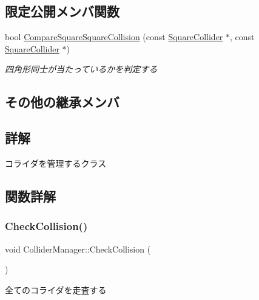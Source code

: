 \subsection*{限定公開メンバ関数}
\begin{DoxyCompactItemize}
\item 
bool \mbox{\hyperlink{class_collider_manager_a612f6096ca24702bff6dee04a88a40c3}{Compare\+Square\+Square\+Collision}} (const \mbox{\hyperlink{class_square_collider}{Square\+Collider}} $\ast$, const \mbox{\hyperlink{class_square_collider}{Square\+Collider}} $\ast$)
\begin{DoxyCompactList}\small\item\em 四角形同士が当たっているかを判定する \end{DoxyCompactList}\end{DoxyCompactItemize}
\subsection*{その他の継承メンバ}


\subsection{詳解}
コライダを管理するクラス 

\subsection{関数詳解}
\mbox{\label{class_collider_manager_af3863143e206b4c86c8b89dd91ff3c8c}} 
\subsubsection{\texorpdfstring{Check\+Collision()}{CheckCollision()}}
{\footnotesize\ttfamily void Collider\+Manager\+::\+Check\+Collision (\begin{DoxyParamCaption}{ }\end{DoxyParamCaption})}



全てのコライダを走査する 

\mbox{\label{class_collider_manager_a612f6096ca24702bff6dee04a88a40c3}} 
